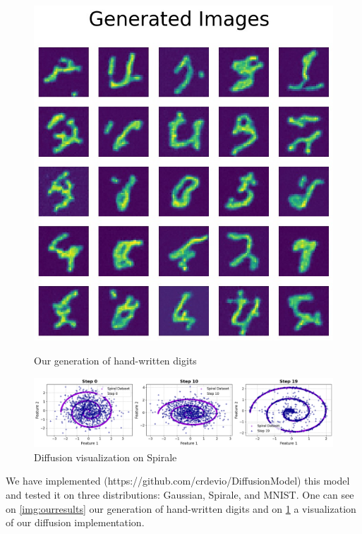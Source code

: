 \documentclass[a4paper,11pt]{article}
\begin{document}
\begin{figure}[h]
    \centering
    \begin{minipage}[b]{0.3\textwidth}
        \centering
        \includegraphics[width=\textwidth]{imgs/mnist_res.jpg}
        \caption{Our generation of hand-written digits}
        \label{img:ourresults}
    \end{minipage}
    \hfill
    \begin{minipage}[b]{0.65\textwidth}
        \centering
        \includegraphics[width=\textwidth]{imgs/res_spirale.png}
        \caption{Diffusion visualization on Spirale}
        \label{img:spiralresults}
    \end{minipage}
\end{figure}


We have implemented (https://github.com/crdevio/DiffusionModel) this model and tested it on three distributions: Gaussian, Spirale, and MNIST. One can see on \cref{img:ourresults} our generation of hand-written digits and on \cref{img:spiralresults} a visualization of our diffusion implementation.
\end{document}
